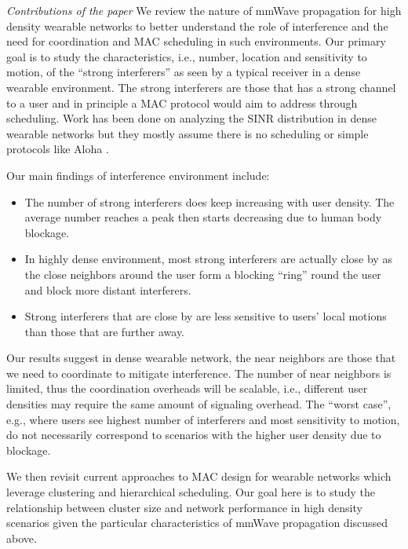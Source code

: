 \documentclass[10pt, conference, letterpaper]{IEEEtran}
\begin{document}
\emph{Contributions of the paper}
We review the nature of mmWave propagation for high density wearable networks to better understand the role of interference and the need for coordination and MAC scheduling in such environments. 
Our primary goal is to study the characteristics, i.e., number, location and sensitivity to motion, of the ``strong interferers'' as seen by a typical receiver in a dense wearable environment. 
The strong interferers are those that has a strong channel to a user and in principle a MAC protocol would aim to address through scheduling. 
Work has been done on analyzing the SINR distribution in dense wearable networks but they mostly assume there is no scheduling or simple protocols like Aloha \cite{interferencefinitesized}\cite{enclosedmmwave}.

Our main findings of interference environment include: 
\begin{itemize}
	\item The number of strong interferers does keep increasing with user density. 
	The average number reaches a peak then starts decreasing due to human body blockage. 
	\item In highly dense environment, most strong interferers are actually close by as the close neighbors around the user form a blocking ``ring'' round the user and block more distant interferers. 
	\item Strong interferers that are close by are less sensitive to users' local motions than those that are further away. 
\end{itemize}

Our results suggest in dense wearable network, the near neighbors are those that we need to coordinate to mitigate interference.  
The number of near neighbors is limited, thus the coordination overheads will be scalable, i.e., different user densities may require the same amount of signaling overhead. 
The ``worst case'', e.g., where users see highest number of interferers and most sensitivity to motion, do not necessarily correspond to scenarios with the higher user density due to blockage.

We then revisit current approaches to MAC design for wearable networks which leverage clustering and hierarchical scheduling. 
Our goal here is to study the relationship between cluster size and network performance in high density scenarios given the particular characteristics of mmWave propagation discussed above. 
\end{document}
